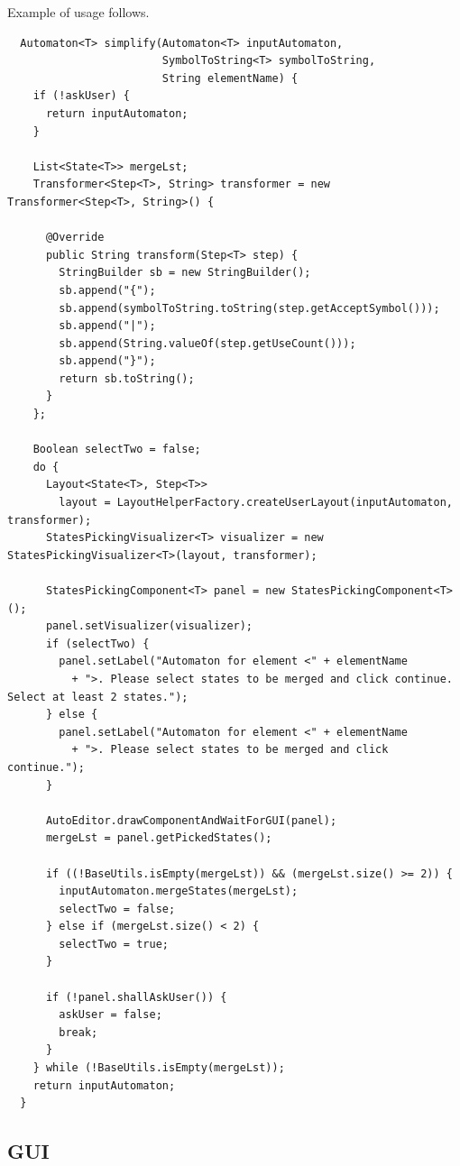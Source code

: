 \documentclass[a4paper,10pt,oneside]{article}
\begin{document}
Example of usage follows.
\begin{verbatim}
  Automaton<T> simplify(Automaton<T> inputAutomaton,
                        SymbolToString<T> symbolToString,
                        String elementName) {
    if (!askUser) {
      return inputAutomaton;
    }

    List<State<T>> mergeLst;
    Transformer<Step<T>, String> transformer = new Transformer<Step<T>, String>() {

      @Override
      public String transform(Step<T> step) {
        StringBuilder sb = new StringBuilder();
        sb.append("{");
        sb.append(symbolToString.toString(step.getAcceptSymbol()));
        sb.append("|");
        sb.append(String.valueOf(step.getUseCount()));
        sb.append("}");
        return sb.toString();
      }
    };

    Boolean selectTwo = false;
    do {
      Layout<State<T>, Step<T>>
        layout = LayoutHelperFactory.createUserLayout(inputAutomaton, transformer);
      StatesPickingVisualizer<T> visualizer = new StatesPickingVisualizer<T>(layout, transformer);

      StatesPickingComponent<T> panel = new StatesPickingComponent<T>();
      panel.setVisualizer(visualizer);
      if (selectTwo) {
        panel.setLabel("Automaton for element <" + elementName
          + ">. Please select states to be merged and click continue. Select at least 2 states.");
      } else {
        panel.setLabel("Automaton for element <" + elementName
          + ">. Please select states to be merged and click continue.");
      }
      
      AutoEditor.drawComponentAndWaitForGUI(panel);
      mergeLst = panel.getPickedStates();

      if ((!BaseUtils.isEmpty(mergeLst)) && (mergeLst.size() >= 2)) {
        inputAutomaton.mergeStates(mergeLst);
        selectTwo = false;
      } else if (mergeLst.size() < 2) {
        selectTwo = true;
      }

      if (!panel.shallAskUser()) {
        askUser = false;
        break;
      }
    } while (!BaseUtils.isEmpty(mergeLst));
    return inputAutomaton;
  }
\end{verbatim}

\subsection{GUI} \label{subsection:GUI}
\end{document}
